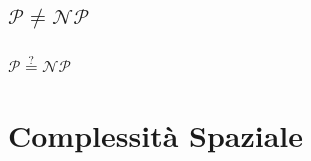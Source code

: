 \documentclass{article}  %
\theoremstyle{definition}
\begin{document}
\subsection{$\mathcal{P} \neq \mathcal{NP}$}
\subsubsection{$\mathcal{P} \overset{?}{=} \mathcal{NP}$}
\break
\section{Complessità Spaziale}
\end{document}
